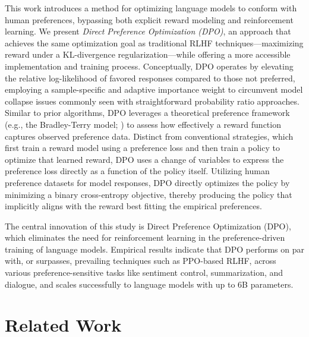 This work introduces a method for optimizing language models to conform with human preferences, bypassing both explicit reward modeling and reinforcement learning. We present \textit{{Direct Preference Optimization} (DPO)}, an approach that achieves the same optimization goal as traditional RLHF techniques—maximizing reward under a KL-divergence regularization—while offering a more accessible implementation and training process. Conceptually, DPO operates by elevating the relative log-likelihood of favored responses compared to those not preferred, employing a sample-specific and adaptive importance weight to circumvent model collapse issues commonly seen with straightforward probability ratio approaches. Similar to prior algorithms, DPO leverages a theoretical preference framework (e.g., the Bradley-Terry model; \cite{bradley1952rankanalysis}) to assess how effectively a reward function captures observed preference data. Distinct from conventional strategies, which first train a reward model using a preference loss and then train a policy to optimize that learned reward, DPO uses a change of variables to express the preference loss directly as a function of the policy itself. Utilizing human preference datasets for model responses, DPO directly optimizes the policy by minimizing a binary cross-entropy objective, thereby producing the policy that implicitly aligns with the reward best fitting the empirical preferences.

The central innovation of this study is Direct Preference Optimization (DPO), which eliminates the need for reinforcement learning in the preference-driven training of language models. Empirical results indicate that DPO performs on par with, or surpasses, prevailing techniques such as PPO-based RLHF, across various preference-sensitive tasks like sentiment control, summarization, and dialogue, and scales successfully to language models with up to 6B parameters.

\section{Related Work}

